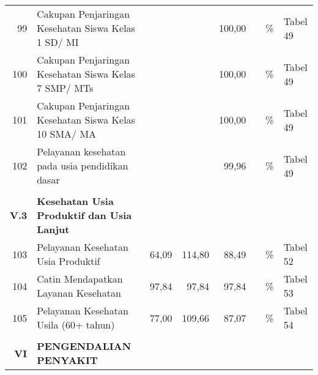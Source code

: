 \begin{small}
\begin{longtable}{rY{12em}rrrrY{5em}Y{5em}}
	 99 & Cakupan Penjaringan Kesehatan Siswa Kelas 1 SD/ MI                                    &        &        &  100,00 &                   & \%                             & Tabel 49 \\
	                  100 & Cakupan Penjaringan Kesehatan Siswa Kelas 7 SMP/ MTs                                  &        &        &  100,00 &                   & \%                             & Tabel 49 \\
	101 & Cakupan Penjaringan Kesehatan Siswa Kelas 10 SMA/ MA                                  &        &        &  100,00 &                   & \%                             & Tabel 49 \\
	                  102 & Pelayanan kesehatan pada usia pendidikan dasar                                        &        &        &   99,96 &                   & \%                             & Tabel 49 \\
	                      &                                                                                       &        &        &         &                   &                                &          \\
	         \textbf{V.3} & \textbf{Kesehatan Usia Produktif dan Usia Lanjut}                                     &        &        &         &                   &                                &          \\
	                  103 & Pelayanan Kesehatan Usia Produktif                                                    &  64,09 & 114,80 &   88,49 &                   & \%                             & Tabel 52 \\
	104 & Catin Mendapatkan Layanan Kesehatan                                                   &  97,84 &  97,84 &   97,84 &                   & \%                             & Tabel 53 \\
	                  105 & Pelayanan Kesehatan Usila (60+ tahun)                                                 &  77,00 & 109,66 &   87,07 &                   & \%                             & Tabel 54 \\
	                      &                                                                                       &        &        &         &                   &                                &          \\
	          \textbf{VI} & \textbf{PENGENDALIAN PENYAKIT}                                                        &        &        &         &                   &                                &          \\

\end{longtable}
\end{small}

